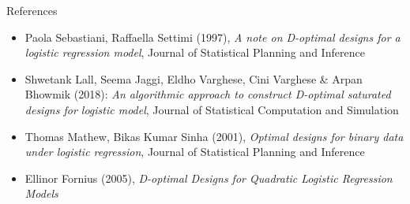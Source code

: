 \documentclass[11pt]{beamer}
\begin{document}
\begin{frame}{References}
\begin{itemize}
\item Paola Sebastiani, Raffaella Settimi (1997),
\textit{A note on D-optimal designs for a logistic regression model},
Journal of Statistical Planning and Inference
\item Shwetank Lall, Seema Jaggi, Eldho Varghese, Cini Varghese \& Arpan
Bhowmik (2018): \textit{An algorithmic approach to construct D-optimal saturated designs for logistic
model}, Journal of Statistical Computation and Simulation
\item Thomas Mathew, Bikas Kumar Sinha (2001),
\textit{Optimal designs for binary data under logistic regression},
Journal of Statistical Planning and Inference
\item Ellinor Fornius (2005), \textit{D-optimal Designs for Quadratic Logistic Regression Models}
\end{itemize}
\end{frame}
%
%
\end{document}
